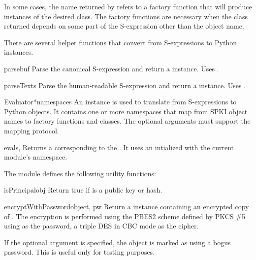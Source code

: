 \documentclass{howto}
\begin{document}
In some cases, the name returned by  refers to
a factory function that will produce instances of the desired class.
The factory functions are necessary when the class returned depends on
some part of the S-expression other than the object name.

There are several helper functions that convert from S-expressions to
Python instances.  

\begin{funcdesc}{parse}{buf}
Parse the canonical S-expression  and return a
 instance.  Uses .
\end{funcdesc}

\begin{funcdesc}{parseText}{s}
Parse the human-readable S-expression  and return a
 instance. Uses .
\end{funcdesc}

\begin{classdesc}{Evaluator}{*namespaces}
An  instance is used to translate from S-expressions
to Python objects.  It contains one or more namespaces that map from
SPKI object names to factory functions and classes.  The optional
 arguments must support the mapping protocol.
\end{classdesc}

\begin{funcdesc}{eval}{s, }
Returns a  corresponding to the
.  It uses an 
intialized with the current module's namespace.
\end{funcdesc}

The module defines the following utility functions:

\begin{funcdesc}{isPrincipal}{obj}
Return true if  is a public key or hash.
\end{funcdesc}

\begin{funcdesc}{encryptWithPassword}{object, pw}
Return a  instance containing an encrypted
copy of .  The encryption is performed using the PBES2
scheme defined by PKCS \#5 using  as the password, a triple
DES in CBC mode as the cipher.

If the optional argument  is specified, the object is
marked as using a bogus password.  This is useful only for testing
purposes.
\end{funcdesc}
\end{document}
